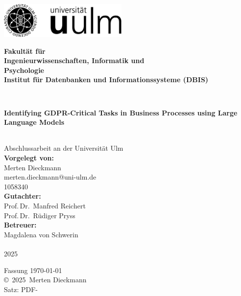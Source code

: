 \documentclass[a4paper,12pt,
headsepline,           %
oneside,               %
pointlessnumbers,      %
bibtotoc,              %
BCOR15mm               %
]{scrbook}
\makeatletter
\newcommand{\fullname}{Merten Dieckmann}
\newcommand{\email}{merten.dieckmann@uni-ulm.de}
\newcommand{\titel}{Identifying GDPR-Critical Tasks in Business Processes using Large Language Models}
\newcommand{\jahr}{2025}
\newcommand{\matnr}{1058340}
\newcommand{\gutachterA}{Prof.\,Dr.\, Manfred Reichert}
\newcommand{\gutachterB}{Prof.\,Dr.\, Rüdiger Pryss}
\newcommand{\betreuer}{Magdalena von Schwerin}
\newcommand{\fakultaet}{Ingenieurwissenschaften, Informatik und\\Psychologie}
\newcommand{\institut}{Institut für Datenbanken und Informationssysteme (DBIS)}
\makeatother
\begin{document}
\frontmatter

\thispagestyle{empty}
\begin{addmargin*}[4mm]{-10mm}

\hfill
\includegraphics[height=1.8cm]{images/logo_uulm_sw.png}\\[1em]

{\footnotesize
\hspace*{115mm}\parbox[t]{35mm}{\bfseries Fakultät für\\
\fakultaet\\
\mdseries \institut}\\[2cm]

\parbox{140mm}{\bfseries \LARGE \titel}\\[2.5em]
{\footnotesize Abschlussarbeit an der Universität Ulm}\\[3em]

{\footnotesize \bfseries Vorgelegt von:}\\
{\footnotesize \fullname\\ \email}\\ \matnr\\[2em]
{\footnotesize \bfseries Gutachter:}\\                     
{\footnotesize \gutachterA\\ \gutachterB}\\[2em]
{\footnotesize \bfseries Betreuer:}\\ 
{\footnotesize \betreuer}\\\\
{\footnotesize \jahr}
}
\end{addmargin*}


\clearpage
\thispagestyle{empty}
{ \small
  \flushleft
  Fassung \today \\\vfill
  \copyright~\jahr~\fullname\\[0.5em]
  Satz: PDF-\LaTeXe
}
\end{document}
